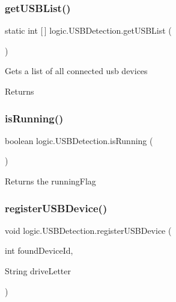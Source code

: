 \subsubsection{\texorpdfstring{get\+U\+S\+B\+List()}{getUSBList()}}
{\footnotesize\ttfamily static int \mbox{[}$\,$\mbox{]} logic.\+U\+S\+B\+Detection.\+get\+U\+S\+B\+List (\begin{DoxyParamCaption}{ }\end{DoxyParamCaption})\hspace{0.3cm}{\ttfamily [static]}}

Gets a list of all connected usb devices \begin{DoxyReturn}{Returns}

\end{DoxyReturn}
\mbox{\label{classlogic_1_1_u_s_b_detection_af59497baf1a3b965b948103da0098fd5}} 
\subsubsection{\texorpdfstring{is\+Running()}{isRunning()}}
{\footnotesize\ttfamily boolean logic.\+U\+S\+B\+Detection.\+is\+Running (\begin{DoxyParamCaption}{ }\end{DoxyParamCaption})}

\begin{DoxyReturn}{Returns}
the running\+Flag 
\end{DoxyReturn}
\mbox{\label{classlogic_1_1_u_s_b_detection_adfbfb167a4d6cc1a5cb186c0246b131a}} 
\subsubsection{\texorpdfstring{register\+U\+S\+B\+Device()}{registerUSBDevice()}}
{\footnotesize\ttfamily void logic.\+U\+S\+B\+Detection.\+register\+U\+S\+B\+Device (\begin{DoxyParamCaption}\item[{int}]{found\+Device\+Id,  }\item[{String}]{drive\+Letter }\end{DoxyParamCaption})\hspace{0.3cm}{\ttfamily [private]}}

